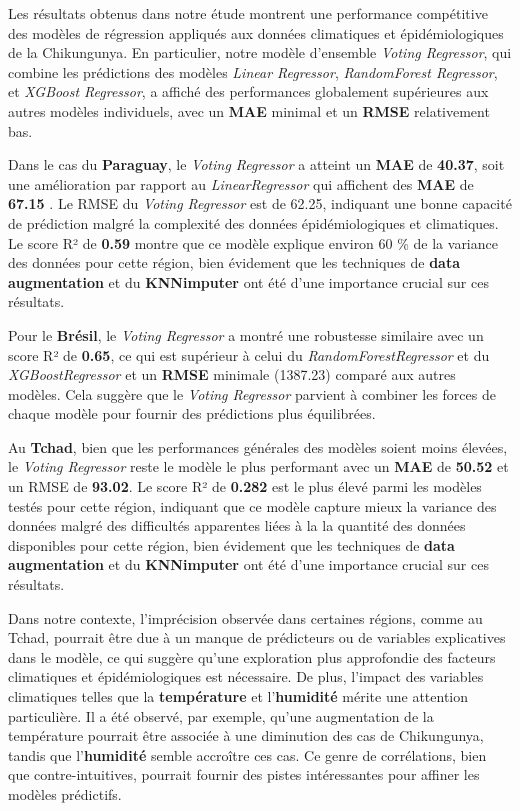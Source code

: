 Les résultats obtenus dans notre étude montrent une performance compétitive des modèles de régression appliqués aux données climatiques et épidémiologiques de la Chikungunya. En particulier, notre modèle d'ensemble \textit{Voting Regressor}, qui combine les prédictions des modèles \textit{Linear Regressor}, \textit{RandomForest Regressor}, et \textit{XGBoost Regressor}, a affiché des performances globalement supérieures aux autres modèles individuels, avec un \textbf{MAE} minimal et un \textbf{RMSE} relativement bas.

Dans le cas du \textbf{Paraguay}, le \textit{Voting Regressor} a atteint un \textbf{MAE} de \textbf{40.37}, soit une amélioration par rapport au \textit{LinearRegressor}  qui affichent des \textbf{MAE} de \textbf{67.15} . Le RMSE du \textit{Voting Regressor} est de 62.25, indiquant une bonne capacité de prédiction malgré la complexité des données épidémiologiques et climatiques. Le score R² de \textbf{0.59 } montre que ce modèle explique environ 60 \% de la variance des données pour cette région, bien évidement que les techniques de \textbf{data augmentation} et du \textbf{KNNimputer} ont été d'une importance crucial sur ces résultats.

Pour le \textbf{Brésil}, le \textit{Voting Regressor} a montré une robustesse similaire avec un score R² de \textbf{0.65}, ce qui est supérieur à celui du \textit{RandomForestRegressor} et du \textit{XGBoostRegressor} et un \textbf{RMSE} minimale (1387.23) comparé aux autres modèles. Cela suggère que le \textit{Voting Regressor} parvient à combiner les forces de chaque modèle pour fournir des prédictions plus équilibrées.

Au \textbf{Tchad}, bien que les performances générales des modèles soient moins élevées, le \textit{Voting Regressor} reste le modèle le plus performant avec un \textbf{MAE} de \textbf{50.52} et un RMSE de \textbf{93.02}. Le score R² de \textbf{0.282} est le plus élevé parmi les modèles testés pour cette région, indiquant que ce modèle capture mieux la variance des données malgré des difficultés apparentes liées à la la quantité des données disponibles pour cette région, bien évidement que les techniques de \textbf{data augmentation} et du \textbf{KNNimputer} ont été d'une importance crucial sur ces résultats.

Dans notre contexte, l'imprécision observée dans certaines régions, comme au Tchad, pourrait être due à un manque de prédicteurs ou de variables explicatives dans le modèle, ce qui suggère qu'une exploration plus approfondie des facteurs climatiques et épidémiologiques est nécessaire. De plus, l'impact des variables climatiques telles que la \textbf{température} et l'\textbf{humidité} mérite une attention particulière. Il a été observé, par exemple, qu'une augmentation de la température pourrait être associée à une diminution des cas de Chikungunya, tandis que l'\textbf{humidité} semble accroître ces cas. Ce genre de corrélations, bien que contre-intuitives, pourrait fournir des pistes intéressantes pour affiner les modèles prédictifs.